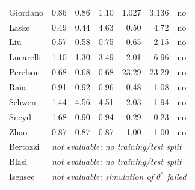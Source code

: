 {\begin{longtable}{@{}lrrrrrc@{}}
Giordano & 0.86 & 0.86 & 1.10 & 1,027 & 3,136 & no \\
Laske & 0.49 & 0.44 & 4.63 & 0.50 & 4.72 & no \\
Liu & 0.57 & 0.58 & 0.75 & 0.65 & 2.15 & no \\
Lucarelli & 1.10 & 1.30 & 3.49 & 2.01 & 6.96 & no \\
Perelson & 0.68 & 0.68 & 0.68 & 23.29 & 23.29 & no \\
Raia & 0.91 & 0.92 & 0.96 & 0.48 & 1.08 & no \\
Schwen & 1.44 & 4.56 & 4.51 & 2.03 & 1.94 & no \\
Sneyd & 1.68 & 0.90 & 0.94 & 0.29 & 0.23 & no \\
Zhao & 0.87 & 0.87 & 0.87 & 1.00 & 1.00 & no \\
Bertozzi & \multicolumn{6}{l}{\textit{not evaluable: no training/test split}} \\
Blasi & \multicolumn{6}{l}{\textit{not evaluable: no training/test split}} \\
Isensee & \multicolumn{6}{l}{\textit{not evaluable: simulation of $\theta^\ast$ failed}} \\
\bottomrule \end{longtable}}


